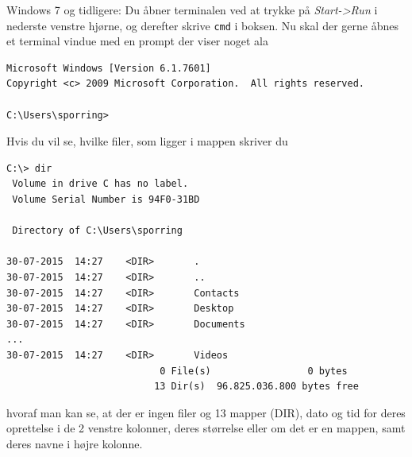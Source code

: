 \documentclass[a4paper]{article}
\begin{document}
Windows 7 og tidligere: Du åbner terminalen ved at trykke på \textit{Start->Run} i nederste venstre hjørne, og derefter skrive \texttt{cmd} i boksen. Nu skal der gerne åbnes et terminal vindue med en prompt der viser noget ala
\begin{lstlisting}[frame=single]
Microsoft Windows [Version 6.1.7601]
Copyright <c> 2009 Microsoft Corporation.  All rights reserved.

C:\Users\sporring>
\end{lstlisting}
Hvis du vil se, hvilke filer, som ligger i mappen skriver du
\begin{lstlisting}[frame=single]
C:\> dir
 Volume in drive C has no label.
 Volume Serial Number is 94F0-31BD

 Directory of C:\Users\sporring

30-07-2015  14:27    <DIR>       .
30-07-2015  14:27    <DIR>       ..
30-07-2015  14:27    <DIR>       Contacts
30-07-2015  14:27    <DIR>       Desktop
30-07-2015  14:27    <DIR>       Documents
...
30-07-2015  14:27    <DIR>       Videos
                           0 File(s)                 0 bytes
                          13 Dir(s)  96.825.036.800 bytes free
\end{lstlisting}
hvoraf man kan se, at der er ingen filer og 13 mapper (DIR), dato og tid for deres oprettelse i de 2 venstre kolonner, deres størrelse eller om det er en mappen, samt deres navne i højre kolonne.
\end{document}
